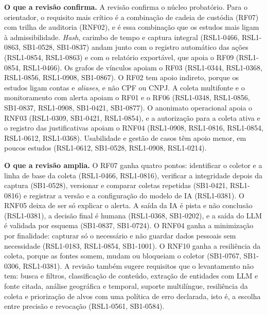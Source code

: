 \textbf{O que a revisão confirma.} A revisão confirma o núcleo probatório.
Para o orientador, o requisito mais crítico é a combinação de cadeia de
custódia (RF07) com trilha de auditoria (RNF02), e é essa combinação que os
estudos mais ligam à admissibilidade. \textit{Hash}, carimbo de tempo e
captura integral (RSL1-0466, RSL1-0863, SB1-0528, SB1-0837) andam junto com
o registro automático das ações (RSL1-0854, RSL1-0863) e com o relatório
exportável, que apoia o RF09 (RSL1-0854, RSL1-0466). Os grafos de vínculos
apoiam o RF03 (RSL1-0344, RSL1-0368, RSL1-0856, RSL1-0908, SB1-0867). O RF02
tem apoio indireto, porque os estudos ligam contas e \textit{aliases}, e não
CPF ou CNPJ. A coleta multifonte e o monitoramento com alerta apoiam o RF01 e
o RF06 (RSL1-0348, RSL1-0856, SB1-0837, RSL1-0908, SB1-0421, SB1-0877). O
anonimato operacional apoia o RNF03 (RSL1-0309, SB1-0421, RSL1-0854), e a
autorização para a coleta ativa e o registro das justificativas apoiam o
RNF04 (RSL1-0908, RSL1-0816, RSL1-0854, RSL1-0612, RSL1-0368). Usabilidade e
gestão de casos têm apoio menor, em poucos estudos (RSL1-0612, SB1-0528,
RSL1-0908, RSL1-0214).

\textbf{O que a revisão amplia.} O RF07 ganha quatro pontos: identificar o
coletor e a linha de base da coleta (RSL1-0466, RSL1-0816), verificar a
integridade depois da captura (SB1-0528), versionar e comparar coletas
repetidas (SB1-0421, RSL1-0816) e registrar a versão e a configuração do
modelo de IA (RSL1-0381). O RNF05 deixa de ser só explicar o alerta. A saída
da IA é pista e não conclusão (RSL1-0381), a decisão final é humana
(RSL1-0368, SB1-0202), e a saída do LLM é validada por esquema (SB1-0837,
SB1-0724). O RNF04 ganha a minimização por finalidade: capturar só o
necessário e não guardar dados pessoais sem necessidade (RSL1-0183,
RSL1-0854, SB1-1001). O RNF10 ganha a resiliência da coleta, porque as
fontes somem, mudam ou bloqueiam o coletor (SB1-0767, SB1-0306, RSL1-0381).
A revisão também sugere requisitos que o levantamento não tem: busca e
filtros, classificação de conteúdo, extração de entidades com LLM e fonte
citada, análise geográfica e temporal, suporte multilíngue, resiliência da
coleta e priorização de alvos com uma política de erro declarada, isto é, a
escolha entre precisão e revocação (RSL1-0561, SB1-0584).

